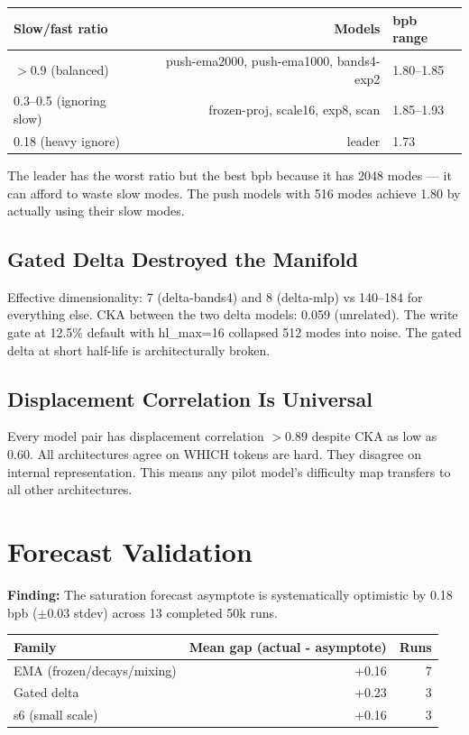 \documentclass[11pt,a4paper]{report}
\newcommand{\finding}[1]{\textcolor{finding}{\textbf{Finding:}} #1}
\begin{document}
\begin{table}[h]
\centering
\begin{tabular}{lrl}
\toprule
\textbf{Slow/fast ratio} & \textbf{Models} & \textbf{bpb range} \\
\midrule
$>0.9$ (balanced) & push-ema2000, push-ema1000, bands4-exp2 & 1.80--1.85 \\
0.3--0.5 (ignoring slow) & frozen-proj, scale16, exp8, scan & 1.85--1.93 \\
0.18 (heavy ignore) & leader & 1.73 \\
\bottomrule
\end{tabular}
\end{table}

The leader has the worst ratio but the best bpb because it has 2048 modes --- it can afford to waste slow modes. The push models with 516 modes achieve 1.80 by actually using their slow modes.

\section{Gated Delta Destroyed the Manifold}

Effective dimensionality: 7 (delta-bands4) and 8 (delta-mlp) vs 140--184 for everything else. CKA between the two delta models: 0.059 (unrelated). The write gate at 12.5\% default with hl\_max=16 collapsed 512 modes into noise. The gated delta at short half-life is architecturally broken.

\section{Displacement Correlation Is Universal}

Every model pair has displacement correlation $>0.89$ despite CKA as low as 0.60. All architectures agree on WHICH tokens are hard. They disagree on internal representation. This means any pilot model's difficulty map transfers to all other architectures.


\chapter{Forecast Validation}

\finding{The saturation forecast asymptote is systematically optimistic by 0.18 bpb ($\pm 0.03$ stdev) across 13 completed 50k runs.}

\begin{table}[h]
\centering
\begin{tabular}{lrr}
\toprule
\textbf{Family} & \textbf{Mean gap (actual - asymptote)} & \textbf{Runs} \\
\midrule
EMA (frozen/decays/mixing) & +0.16 & 7 \\
Gated delta & +0.23 & 3 \\
s6 (small scale) & +0.16 & 3 \\
\bottomrule
\end{tabular}
\end{table}
\end{document}
